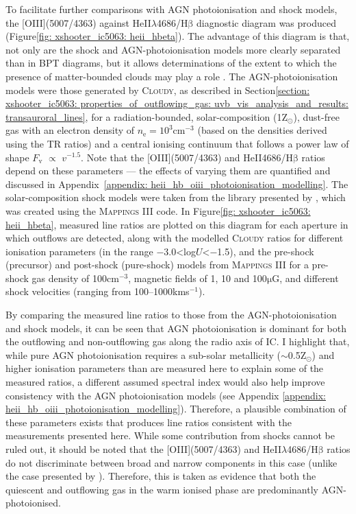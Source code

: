 To facilitate further comparisons with AGN photoionisation and shock models, the [OIII](5007/4363) against HeII$\lambda$4686/H$\mathrm{\beta}$ diagnostic diagram was produced (Figure\;\ref{fig: xshooter_ic5063: heii_hbeta}). The advantage of this diagram is that, not only are the shock and AGN-photoionisation models more clearly separated than in BPT diagrams, but it allows determinations of the extent to which the presence of matter-bounded clouds may play a role \citep{VillarMartin1999}. The AGN-photoionisation models were those generated by \textsc{Cloudy}, as described in Section\;\ref{section: xshooter_ic5063: properties_of_outflowing_gas: uvb_vis_analysis_and_results: transauroral_lines}, for a radiation-bounded, solar-composition (1\;Z$_\odot$), dust-free gas with an electron density of $n_\mathrm{e}=10^3$\;cm$^{-3}$ (based on the densities derived using the TR ratios) and a central ionising continuum that follows a power law of shape $F_\mathrm{v}$ $\propto$ $v^{-1.5}$. Note that the [OIII](5007/4363) and HeII4686/H$\mathrm{\beta}$ ratios depend on these parameters --- the effects of varying them are quantified and discussed in \mbox{Appendix \ref{appendix: heii_hb_oiii_photoionisation_modelling}}. The solar-composition shock models were taken from the library presented by \citet{Allen2008}, which was created using the \textsc{Mappings III} code. In \mbox{Figure\;\ref{fig: xshooter_ic5063: heii_hbeta}}, measured line ratios are plotted on this diagram for each aperture in which outflows are detected, along with the modelled \textsc{Cloudy} ratios for different ionisation parameters (in the range \mbox{$-$3.0\;\textless\;log$U$\;\textless\;$-$1.5}), and the pre-shock (precursor) and post-shock (pure-shock) models from \textsc{Mappings III} for a pre-shock gas density of 100\;cm$^{-3}$, magnetic fields of 1, 10 and 100\;$\mathrm{{\mu}G}$, and different shock velocities (ranging from 100--1000\;km\;s$^{-1}$).

By comparing the measured line ratios to those from the AGN-photoionisation and shock models, it can be seen that AGN photoionisation is dominant for both the outflowing and non-outflowing gas along the radio axis of IC. I highlight that, while pure AGN photoionisation requires a sub-solar metallicity ($\sim$0.5\;Z$_\odot$) and higher ionisation parameters than are measured here to explain some of the measured ratios, a different assumed spectral index would also help improve consistency with the AGN photoionisation models (see Appendix \ref{appendix: heii_hb_oiii_photoionisation_modelling}). Therefore, a plausible combination of these parameters exists that produces line ratios consistent with the measurements presented here. While some contribution from shocks cannot be ruled out, it should be noted that the [OIII](5007/4363) and HeII$\lambda$4686/H$\mathrm{\beta}$ ratios do not discriminate between broad and narrow components in this case (unlike the case presented by \citealt{VillarMartin1999}). Therefore, this is taken as evidence that both the quiescent and outflowing gas in the warm ionised phase are predominantly AGN-photoionised.

